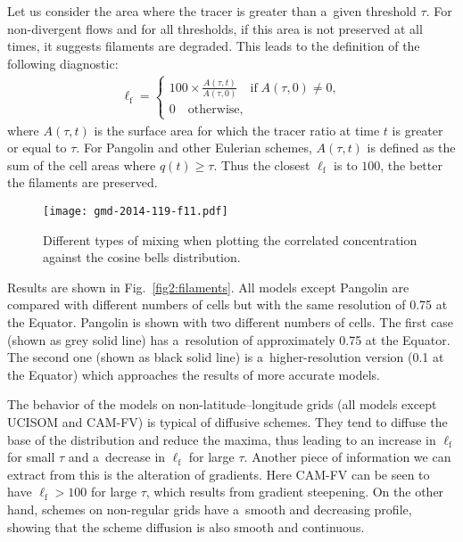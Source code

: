    Let us consider the area where the tracer is greater than a~given
   threshold $\tau$. For non-divergent flows and for all thresholds, if this
   area is not preserved at all times, it suggests filaments are
   degraded. This leads to the definition of the following diagnostic:
\begin{align*}
  \ell_{\mathrm{f}} =
    \begin{cases}
      \displaystyle 100 \times \frac{A(\tau,t)}{A(\tau,0)} \quad \text{if} \;
      A(\tau,0) \neq 0,\\
      0 \quad \text{otherwise,}
    \end{cases}
    \end{align*}
    where $A(\tau,t)$ is the surface area for which the tracer ratio
    at time $t$ is greater or equal to $\tau$. For Pangolin and other
    Eulerian schemes, $A(\tau,t)$ is defined as the sum of the cell
    areas where $q(t) \ge \tau$.  Thus the closest $\ell_{\mathrm{f}}$ is to
    $100$, the better the filaments are preserved.


\begin{figure}[t]
\texttt{[image: gmd-2014-119-f11.pdf]}
  \centering
\caption{Different types of mixing when plotting the correlated concentration
  against the cosine bells distribution.}
\label{fig2:mixing}%
\end{figure}%

    Results are shown in Fig.~\ref{fig2:filaments}. All models except Pangolin
    are compared with different numbers of cells but with the same resolution of
    0.75{\degree} at the Equator. Pangolin is shown with two different numbers of
    cells. The first case (shown as grey solid line) has a~resolution of
    approximately 0.75{\degree} at the Equator. The second one (shown as
    black solid line) is a~higher-resolution version (0.1{\degree} at the Equator)
    which approaches the results of more accurate models.

    The behavior of the models on non-latitude--longitude grids (all
    models except UCISOM and CAM-FV) is typical of diffusive
    schemes. They tend to diffuse the base of the distribution and
    reduce the maxima, thus leading to an increase in $\ell_{\mathrm{f}}$ for
    small $\tau$ and a~decrease in $\ell_{\mathrm{f}}$ for large $\tau$.
    Another piece of information we can extract from this is the alteration of
    gradients. Here CAM-FV can be seen to have $\ell_{\mathrm{f}} > 100$ for
    large $\tau$, which results from gradient steepening. On the
    other hand, schemes on non-regular grids have a~smooth and
    decreasing profile, showing that the scheme diffusion is also smooth
    and continuous.


